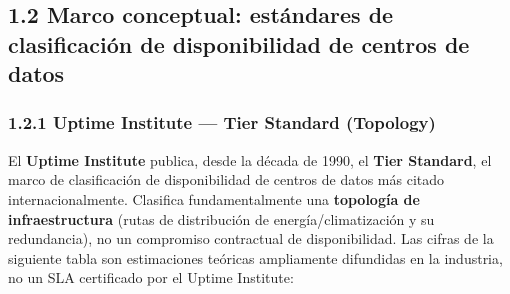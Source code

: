 \documentclass[11pt,a4paper]{article}
\begin{document}
\subsection{1.2 Marco conceptual: estándares de clasificación de disponibilidad de centros de datos}\label{marco-conceptual-estuxe1ndares-de-clasificaciuxf3n-de-disponibilidad-de-centros-de-datos}

\subsubsection{1.2.1 Uptime Institute --- Tier Standard (Topology)}\label{uptime-institute-tier-standard-topology}

El \textbf{Uptime Institute} publica, desde la década de 1990, el \textbf{Tier Standard}, el marco de clasificación de disponibilidad de centros de datos más citado internacionalmente. Clasifica fundamentalmente una \textbf{topología de infraestructura} (rutas de distribución de energía/climatización y su redundancia), no un compromiso contractual de disponibilidad. Las cifras de la siguiente tabla son estimaciones teóricas ampliamente difundidas en la industria, no un SLA certificado por el Uptime Institute:
\end{document}
